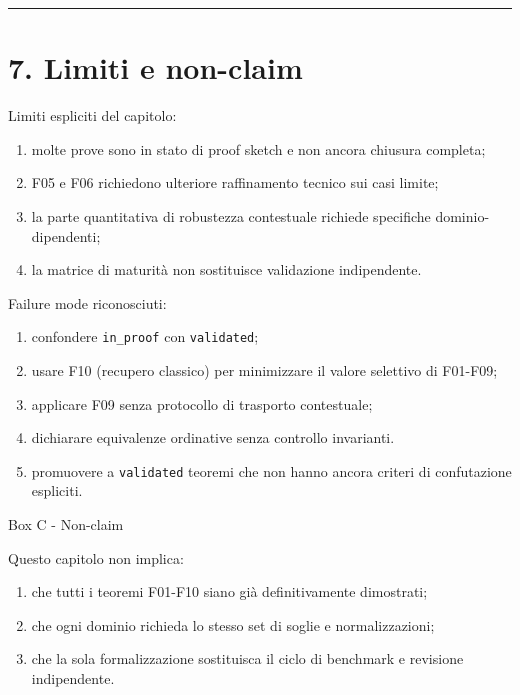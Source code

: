 \begin{center}\rule{0.5\linewidth}{0.5pt}\end{center}

\section{7. Limiti e non-claim}

Limiti espliciti del capitolo:

\begin{enumerate}
\def\labelenumi{\arabic{enumi}.}
\tightlist
\item
  molte prove sono in stato di proof sketch e non ancora chiusura completa;
\item
  F05 e F06 richiedono ulteriore raffinamento tecnico sui casi limite;
\item
  la parte quantitativa di robustezza contestuale richiede specifiche dominio-dipendenti;
\item
  la matrice di maturità non sostituisce validazione indipendente.
\end{enumerate}

Failure mode riconosciuti:

\begin{enumerate}
\def\labelenumi{\arabic{enumi}.}
\tightlist
\item
  confondere \texttt{in\_proof} con \texttt{validated};
\item
  usare F10 (recupero classico) per minimizzare il valore selettivo di F01-F09;
\item
  applicare F09 senza protocollo di trasporto contestuale;
\item
  dichiarare equivalenze ordinative senza controllo invarianti.
\item
  promuovere a \texttt{validated} teoremi che non hanno ancora criteri di confutazione espliciti.
\end{enumerate}

Box C - Non-claim

Questo capitolo non implica:

\begin{enumerate}
\def\labelenumi{\arabic{enumi}.}
\tightlist
\item
  che tutti i teoremi F01-F10 siano già definitivamente dimostrati;
\item
  che ogni dominio richieda lo stesso set di soglie e normalizzazioni;
\item
  che la sola formalizzazione sostituisca il ciclo di benchmark e revisione indipendente.
\end{enumerate}

